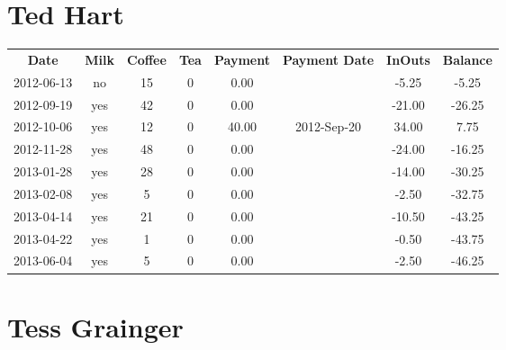 \section{Ted Hart}

\begin{center}
\begin{tabular}{cccccccc}
\textbf{Date} & \textbf{Milk} & \textbf{Coffee} & \textbf{Tea} & \textbf{Payment} & \textbf{Payment Date} & \textbf{InOuts} & \textbf{Balance} \\
2012-06-13 & no & 15 & 0 &  0.00 &  &  -5.25 &  -5.25\\ 
2012-09-19 & yes & 42 & 0 &  0.00 &  & -21.00 & -26.25\\ 
2012-10-06 & yes & 12 & 0 & 40.00 & 2012-Sep-20 &  34.00 &   7.75\\ 
2012-11-28 & yes & 48 & 0 &  0.00 &  & -24.00 & -16.25\\ 
2013-01-28 & yes & 28 & 0 &  0.00 &  & -14.00 & -30.25\\ 
2013-02-08 & yes &  5 & 0 &  0.00 &  &  -2.50 & -32.75\\ 
2013-04-14 & yes & 21 & 0 &  0.00 &  & -10.50 & -43.25\\ 
2013-04-22 & yes &  1 & 0 &  0.00 &  &  -0.50 & -43.75\\ 
2013-06-04 & yes &  5 & 0 &  0.00 &  &  -2.50 & -46.25
\end{tabular}
\end{center}

\section{Tess Grainger}

